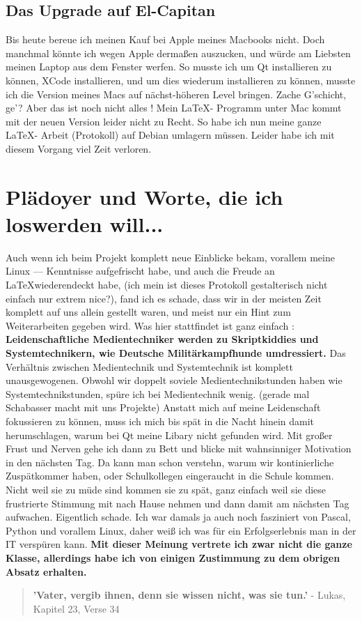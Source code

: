 \subsection{Das Upgrade auf El-Capitan}
Bis heute bereue ich meinen Kauf bei Apple meines Macbooks nicht.
Doch manchmal könnte ich wegen Apple dermaßen auszucken, und würde 
am Liebsten meinen Laptop aus dem Fenster werfen.
So musste ich um Qt installieren zu können,
XCode installieren, und um dies wiederum installieren zu können,
musste ich die Version meines Macs auf nächst-höheren Level bringen.
Zache G'schicht, ge'?
Aber das ist noch nicht alles !
Mein \LaTeX - Programm unter Mac kommt mit der neuen Version leider nicht zu Recht. So habe ich nun meine ganze \LaTeX - Arbeit (Protokoll) auf Debian umlagern müssen.
Leider habe ich mit diesem Vorgang viel Zeit verloren.

\newpage
\section{Plädoyer und Worte, die ich loswerden will...}
Auch wenn ich beim Projekt komplett neue Einblicke bekam, vorallem meine Linux --- Kenntnisse aufgefrischt habe, und auch die Freude an \LaTeX  wiederendeckt habe, (ich mein ist dieses Protokoll gestalterisch nicht einfach nur extrem nice?), fand ich es schade, dass wir in der meisten Zeit komplett auf uns allein gestellt waren, und meist nur ein Hint zum Weiterarbeiten gegeben wird.
Was hier stattfindet ist ganz einfach :
\textbf{Leidenschaftliche Medientechniker werden zu Skriptkiddies und Systemtechnikern, wie Deutsche Militärkampfhunde umdressiert.}
Das Verhältnis zwischen Medientechnik und Systemtechnik ist komplett unausgewogenen.
Obwohl wir doppelt soviele Medientechnikstunden haben wie Systemtechnikstunden, spüre ich bei Medientechnik wenig. (gerade mal Schabasser macht mit uns Projekte)
Anstatt mich auf meine Leidenschaft fokussieren zu können, muss ich mich bis spät in die Nacht hinein damit herumschlagen, warum bei Qt meine Libary nicht gefunden wird.
Mit großer Frust und Nerven gehe ich dann zu Bett und blicke mit wahnsinniger Motivation in den nächsten Tag. Da kann man schon verstehn, warum wir kontinierliche Zuspätkommer haben, oder Schulkollegen eingeraucht in die Schule kommen.
Nicht weil sie zu müde sind kommen sie zu spät, ganz einfach weil sie diese frustrierte Stimmung mit nach Hause nehmen und dann damit am nächsten Tag aufwachen. Eigentlich schade. Ich war damals ja auch noch fasziniert von Pascal, Python und vorallem Linux, daher weiß ich was für ein Erfolgserlebnis man in der IT verspüren kann.
\textbf{Mit dieser Meinung vertrete ich zwar nicht die ganze Klasse, allerdings habe ich von einigen Zustimmung zu dem obrigen Absatz erhalten.}
\begin{quote}
	\textbf{'Vater, vergib ihnen, denn sie wissen nicht, was sie tun.'}\linebreak
	- Lukas, Kapitel 23, Verse 34
\end{quote}